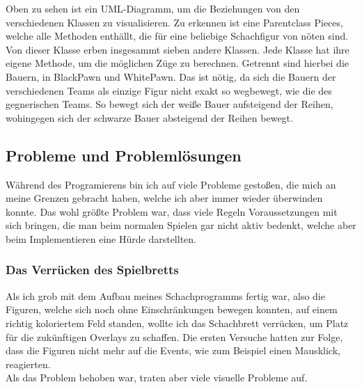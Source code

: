 \documentclass[a4paper, 10pt]{scrartcl}
\begin{document}
Oben zu sehen ist ein UML-Diagramm, um die Beziehungen von den verschiedenen
Klassen zu visualisieren. Zu erkennen ist eine Parentclass \glqq{}Pieces\grqq ,
welche alle Methoden enthällt, die für eine beliebige Schachfigur von nöten sind.
Von dieser Klasse erben insgesammt sieben andere Klassen. Jede Klasse hat ihre eigene
Methode, um die möglichen Züge zu berechnen. Getrennt sind hierbei die Bauern, in
\glqq BlackPawn\grqq{} und \glqq WhitePawn\grqq{}. Das ist nötig, da sich die Bauern der verschiedenen Teams als
einzige Figur nicht exakt so wegbewegt, wie die des gegnerischen Teams. So bewegt sich
der weiße Bauer aufsteigend der Reihen, wohingegen sich der schwarze Bauer absteigend der
Reihen bewegt. 

\subsection{Probleme und Problemlösungen}
Während des Programierens bin ich auf viele Probleme gestoßen, die mich an meine Grenzen gebracht haben, welche ich aber immer wieder überwinden konnte.
Das wohl größte Problem war, dass viele Regeln Voraussetzungen mit sich bringen, die man beim normalen Spielen gar nicht aktiv bedenkt, welche aber
beim Implementieren eine Hürde darstellten.

\subsubsection*{Das Verrücken des Spielbretts}
Als ich grob mit dem Aufbau meines Schachprogramms
fertig war, also die Figuren, welche sich noch ohne
Einschränkungen bewegen konnten, auf einem richtig koloriertem
Feld standen, wollte ich das Schachbrett verrücken, um Platz für
die zukünftigen Overlays zu schaffen.
Die ersten Versuche hatten zur Folge, dass die Figuren nicht mehr auf die
Events, wie zum Beispiel einen Mausklick, reagierten.\\
Als das Problem behoben war, traten aber viele visuelle Probleme auf.
\end{document}
